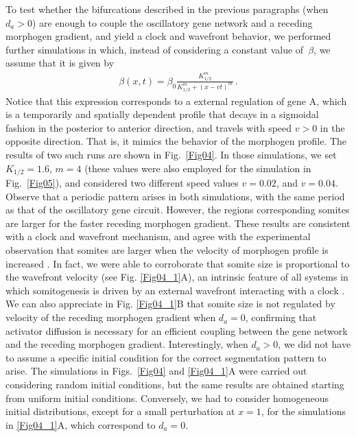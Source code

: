 \documentclass[%
 preprint,
 aip, 
 amsmath,amssymb,
]{revtex4-2}
\begin{document}
To test whether the bifurcations described in the previous paragraphs (when $d_a > 0$) are enough to couple the oscillatory gene network and a receding morphogen gradient, and yield a clock and wavefront behavior, we performed further simulations in which, instead of considering a constant value of~$\beta$, we assume that it is given by
	\begin{gather}\label{eqbeta}
	\beta(x, t) = \beta_0 \frac{K_{1/2}^m}{K_{1/2}^m + (x - v t)^m}\,.
	\end{gather}
Notice that this expression corresponds to a external regulation of gene A, which is a temporarily and spatially dependent profile that decays in a sigmoidal fashion in the posterior to anterior direction, and travels with speed $v>0$ in the opposite direction. That is, it mimics the behavior of the morphogen profile. The results of two such runs are shown in Fig.~\ref{Fig04}. In those simulations, we set $K_{1/2} =1.6 $, $m = 4 $ (these values were also employed for the simulation in Fig.~\ref{Fig05}), and considered two different speed values $v = 0.02 $, and $v = 0.04$. Observe that a periodic pattern arises in both simulations, with the same period as that of the oscillatory gene circuit. However, the regions corresponding somites are larger for the faster receding morphogen gradient. These results are consistent with a clock and wavefront mechanism, and agree with the experimental observation that somites are larger when the velocity of morphogen profile is increased \cite{Sawada2001}. In fact, we were able to corroborate that somite size is proportional to the wavefront velocity (see Fig. \ref{Fig04_1}A), an intrinsic feature of all systems in which somitogenesis is driven by an external wavefront interacting with a clock \cite{Morelli2009}. We can also appreciate  in Fig. \ref{Fig04_1}B that somite size is not regulated by velocity of the receding morphogen gradient when $d_a=0$, confirming that activator diffusion is necessary for an efficient coupling between the gene network and the receding morphogen gradient. Interestingly, when $d_a > 0$, we did not have to  assume a specific initial condition for the correct segmentation pattern to arise. The simulations in Figs.~\ref{Fig04} and \ref{Fig04_1}A were carried out considering random initial conditions, but the same results are obtained starting from uniform initial conditions. Conversely, we had to consider homogeneous initial distributions, except for a small perturbation at $x=1$, for the simulations in \ref{Fig04_1}A, which correspond to $d_a=0$.
\end{document}
